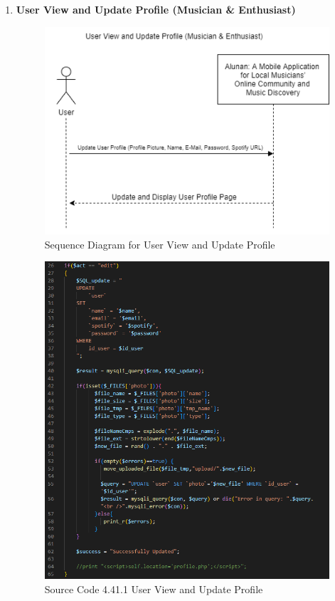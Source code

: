\begin{enumerate}[1.]
    \item \textbf{User View and Update Profile (Musician \& Enthusiast)}
    \begin{figure}[h]
        \centering
        \includegraphics[width=0.7\linewidth]{mainmatter/images/systemint/siupdateprofile.png}
        \caption{Sequence Diagram for User View and Update Profile}
        \label{fig:myfig77}
    \end{figure}
    \begin{figure}[h]\ContinuedFloat
        \centering
        \includegraphics[width=0.7\linewidth]{mainmatter/images/systemint/codeprofile.png}
        \caption*{Source Code 4.41.1 User View and Update Profile}
        \label{fig:myfig77a}
    \end{figure}
    \clearpage


\end{enumerate}
